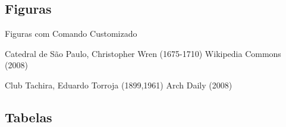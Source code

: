 \documentclass[aspectratio=169]{beamer}
\begin{document}

\subsection{Figuras}

\begin{frame}{Figuras com Comando Customizado}

\centering

\begin{minipage}{0.5\linewidth}

      {Catedral de São Paulo, Christopher Wren (1675-1710)}%
      {Wikipedia Commons (2008)}
\end{minipage}
\hfill
\begin{minipage}{0.4\linewidth}
    
      {Club Tachira, Eduardo Torroja (1899,1961)}%
      {Arch Daily (2008)}
\end{minipage}

\end{frame}


\subsection{Tabelas}
\end{document}
